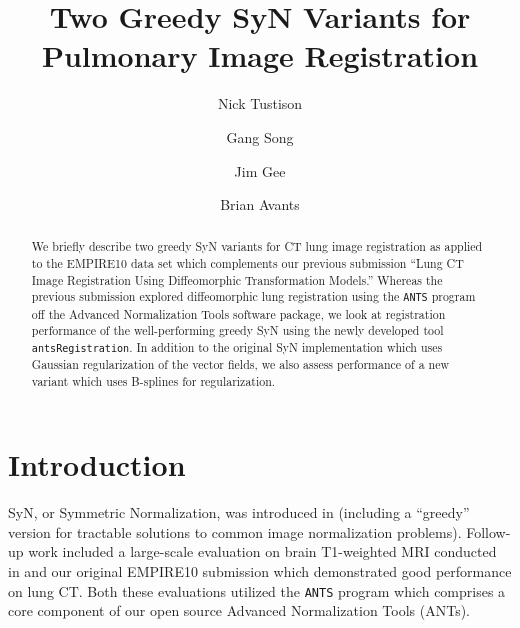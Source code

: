 \documentclass{llncs}
\begin{document}
%
\frontmatter          %
%

\mainmatter              %
%
\title{Two Greedy SyN Variants for Pulmonary Image Registration}

\titlerunning{}  %
%
\author{Nick Tustison \and Gang Song \and Jim Gee \and Brian Avants}


\maketitle              %

\begin{abstract}
We briefly describe two greedy SyN variants for CT lung image registration
as applied to the EMPIRE10 data set which complements our previous 
submission ``Lung CT Image Registration Using Diffeomorphic Transformation 
Models.'' Whereas the previous submission explored diffeomorphic lung registration 
using the {\tt ANTS} program off the Advanced Normalization Tools software 
package, we look at registration performance of the well-performing greedy 
SyN using the newly developed tool {\tt antsRegistration}.  In addition
to the original SyN implementation which uses Gaussian regularization of the
vector fields, we also assess performance of a new variant which uses B-splines
for regularization.
\end{abstract}

\section{Introduction}

SyN, or Symmetric Normalization, was introduced in \cite{avants2008} (including
a ``greedy'' version for tractable solutions to common image normalization 
problems).  Follow-up work included a large-scale evaluation on brain T1-weighted
MRI conducted in \cite{avants2011} and our original EMPIRE10 submission 
\cite{song2010} which demonstrated good performance on lung CT.  Both these
evaluations utilized the {\tt ANTS} program which comprises a core component
of our open source Advanced Normalization Tools (ANTs).
\end{document}
